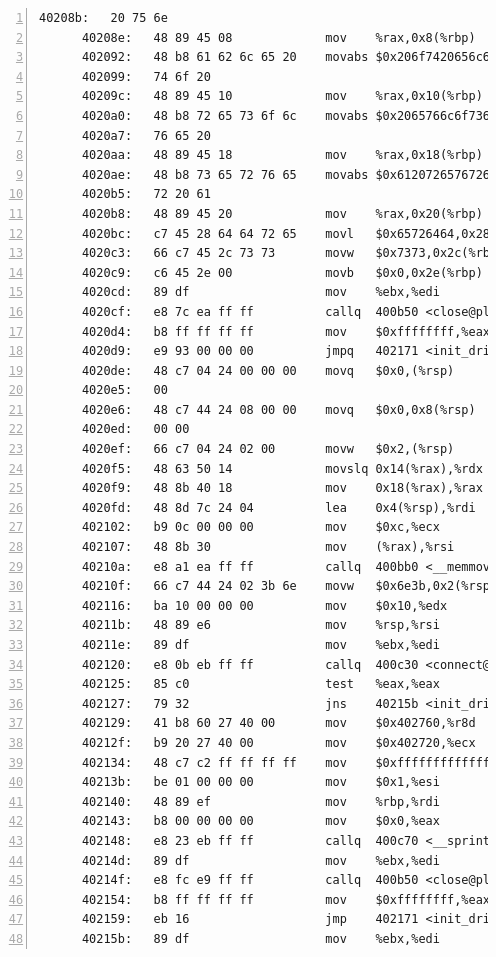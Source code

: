 \documentclass{article}
\begin{document}
\begin{lstlisting}[title = bomb的反汇编代码及部分注释, xleftmargin = 2em,xrightmargin = 2em, aboveskip = 1em, numbers = left, basicstyle=\scriptsize\ttfamily, numberstyle=\scriptsize]
      40208b:	20 75 6e 
      40208e:	48 89 45 08          	mov    %rax,0x8(%rbp)
      402092:	48 b8 61 62 6c 65 20 	movabs $0x206f7420656c6261,%rax
      402099:	74 6f 20 
      40209c:	48 89 45 10          	mov    %rax,0x10(%rbp)
      4020a0:	48 b8 72 65 73 6f 6c 	movabs $0x2065766c6f736572,%rax
      4020a7:	76 65 20 
      4020aa:	48 89 45 18          	mov    %rax,0x18(%rbp)
      4020ae:	48 b8 73 65 72 76 65 	movabs $0x6120726576726573,%rax
      4020b5:	72 20 61 
      4020b8:	48 89 45 20          	mov    %rax,0x20(%rbp)
      4020bc:	c7 45 28 64 64 72 65 	movl   $0x65726464,0x28(%rbp)
      4020c3:	66 c7 45 2c 73 73    	movw   $0x7373,0x2c(%rbp)
      4020c9:	c6 45 2e 00          	movb   $0x0,0x2e(%rbp)
      4020cd:	89 df                	mov    %ebx,%edi
      4020cf:	e8 7c ea ff ff       	callq  400b50 <close@plt>
      4020d4:	b8 ff ff ff ff       	mov    $0xffffffff,%eax
      4020d9:	e9 93 00 00 00       	jmpq   402171 <init_driver+0x1b9>
      4020de:	48 c7 04 24 00 00 00 	movq   $0x0,(%rsp)
      4020e5:	00 
      4020e6:	48 c7 44 24 08 00 00 	movq   $0x0,0x8(%rsp)
      4020ed:	00 00 
      4020ef:	66 c7 04 24 02 00    	movw   $0x2,(%rsp)
      4020f5:	48 63 50 14          	movslq 0x14(%rax),%rdx
      4020f9:	48 8b 40 18          	mov    0x18(%rax),%rax
      4020fd:	48 8d 7c 24 04       	lea    0x4(%rsp),%rdi
      402102:	b9 0c 00 00 00       	mov    $0xc,%ecx
      402107:	48 8b 30             	mov    (%rax),%rsi
      40210a:	e8 a1 ea ff ff       	callq  400bb0 <__memmove_chk@plt>
      40210f:	66 c7 44 24 02 3b 6e 	movw   $0x6e3b,0x2(%rsp)
      402116:	ba 10 00 00 00       	mov    $0x10,%edx
      40211b:	48 89 e6             	mov    %rsp,%rsi
      40211e:	89 df                	mov    %ebx,%edi
      402120:	e8 0b eb ff ff       	callq  400c30 <connect@plt>
      402125:	85 c0                	test   %eax,%eax
      402127:	79 32                	jns    40215b <init_driver+0x1a3>
      402129:	41 b8 60 27 40 00    	mov    $0x402760,%r8d
      40212f:	b9 20 27 40 00       	mov    $0x402720,%ecx
      402134:	48 c7 c2 ff ff ff ff 	mov    $0xffffffffffffffff,%rdx
      40213b:	be 01 00 00 00       	mov    $0x1,%esi
      402140:	48 89 ef             	mov    %rbp,%rdi
      402143:	b8 00 00 00 00       	mov    $0x0,%eax
      402148:	e8 23 eb ff ff       	callq  400c70 <__sprintf_chk@plt>
      40214d:	89 df                	mov    %ebx,%edi
      40214f:	e8 fc e9 ff ff       	callq  400b50 <close@plt>
      402154:	b8 ff ff ff ff       	mov    $0xffffffff,%eax
      402159:	eb 16                	jmp    402171 <init_driver+0x1b9>
      40215b:	89 df                	mov    %ebx,%edi

\end{lstlisting}
\end{document}
